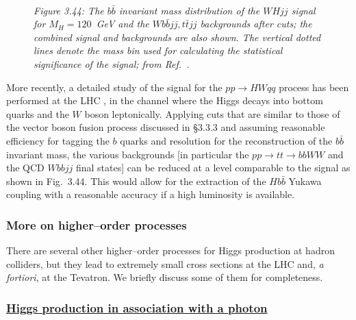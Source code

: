 \begin{figure}[htbp]
\begin{center}
\\[3mm]
\end{center}
\vspace*{-3mm}
{\it Figure 3.44: The $b\bar{b}$ invariant mass distribution of the $WHjj$ 
signal for $M_H = 120$~GeV and the $W b\bar{b}jj, t\bar{t}jj$ backgrounds 
after cuts; the combined signal and backgrounds are also shown. The vertical 
dotted lines denote the mass bin used for calculating the statistical 
significance of the signal; from Ref.~\cite{pp-HVqq-Rain}.}
\vspace*{-3mm}
\end{figure}

More recently, a detailed study of the signal for the $pp \to HWqq$ process has
been performed at the LHC \cite{pp-HVqq-Rain}, in the channel where the Higgs
decays into bottom quarks and the $W$ boson leptonically. Applying cuts that
are similar to those of the vector boson fusion process discussed in \S3.3.3
and assuming reasonable efficiency for tagging the $b$ quarks and resolution
for the reconstruction of the $b\bar{b}$ invariant mass, the various
backgrounds [in particular the $pp \to tt \to bbWW$ and the QCD $Wbbjj$ final
states] can be reduced at a level comparable to the signal as shown in
Fig.~3.44. This would allow for the extraction of the $Hb\bar b$ Yukawa
coupling with a reasonable accuracy if a high luminosity is available.  

\subsubsection{More on higher--order processes}

There are several other higher--order processes for Higgs production at hadron
colliders, but they lead to extremely small cross sections at the LHC and, {\it
a fortiori}, at the Tevatron. We briefly discuss some of them for completeness. 

\subsubsection*{\underline{Higgs production in association with a
photon}}

